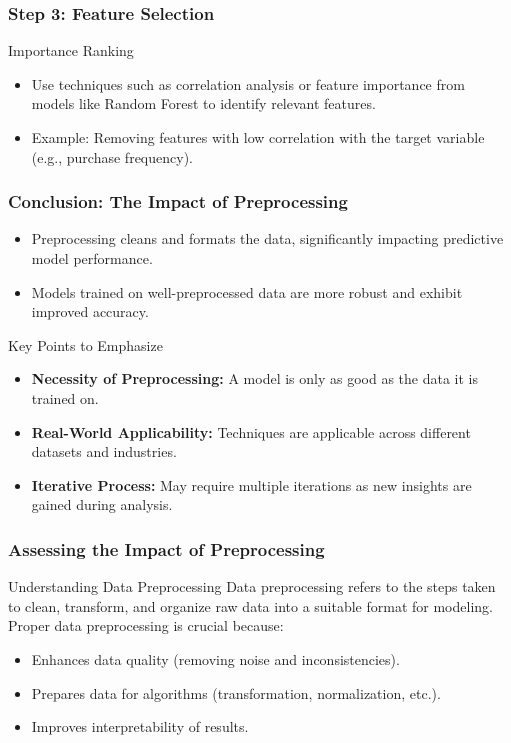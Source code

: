 \documentclass[aspectratio=169]{beamer}
\begin{document}
\begin{frame}
    \frametitle{Step 3: Feature Selection}
    \begin{block}{Importance Ranking}
        \begin{itemize}
            \item Use techniques such as correlation analysis or feature importance from models like Random Forest to identify relevant features.
            \item Example: Removing features with low correlation with the target variable (e.g., purchase frequency).
        \end{itemize}
    \end{block}
\end{frame}

\begin{frame}
    \frametitle{Conclusion: The Impact of Preprocessing}
    \begin{itemize}
        \item Preprocessing cleans and formats the data, significantly impacting predictive model performance.
        \item Models trained on well-preprocessed data are more robust and exhibit improved accuracy.
    \end{itemize}

    \begin{block}{Key Points to Emphasize}
        \begin{itemize}
            \item \textbf{Necessity of Preprocessing:} A model is only as good as the data it is trained on.
            \item \textbf{Real-World Applicability:} Techniques are applicable across different datasets and industries.
            \item \textbf{Iterative Process:} May require multiple iterations as new insights are gained during analysis.
        \end{itemize}
    \end{block}
\end{frame}

\begin{frame}[fragile]
    \frametitle{Assessing the Impact of Preprocessing}
    \begin{block}{Understanding Data Preprocessing}
        Data preprocessing refers to the steps taken to clean, transform, and organize raw data into a suitable format for modeling. Proper data preprocessing is crucial because:
    \end{block}
    \begin{itemize}
        \item Enhances data quality (removing noise and inconsistencies).
        \item Prepares data for algorithms (transformation, normalization, etc.).
        \item Improves interpretability of results.
    \end{itemize}
\end{frame}
\end{document}
